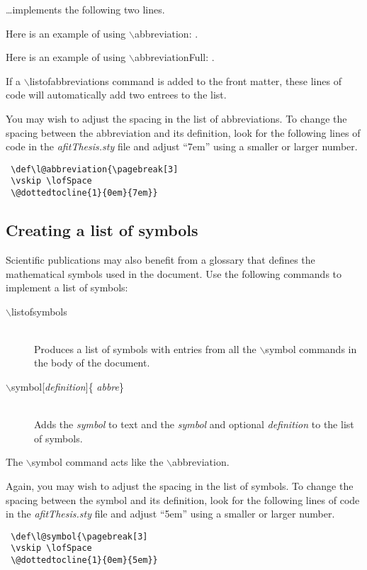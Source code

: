 \noindent \ldots implements the following two lines.

Here is an example of using $\backslash${abbreviation}: .

Here is an example of using $\backslash${abbreviationFull}:  .

\noindent If a $\backslash${listofabbreviations} command is added to the front
matter, these lines of code will automatically add two entrees to the list.

You may wish to adjust the spacing in the list of abbreviations.  To
change the spacing between the abbreviation and its definition, look
for the following lines of code in the {\em afitThesis.sty} file and
adjust ``7em'' using a smaller or larger number.

\begin{verbatim} 
 \def\l@abbreviation{\pagebreak[3]
 \vskip \lofSpace 
 \@dottedtocline{1}{0em}{7em}}
\end{verbatim}


\subsection{Creating a list of symbols}

Scientific publications may also benefit from a glossary that defines
the mathematical symbols used in the document.  Use the following
commands to implement a list of symbols:

\begin{description}
    \item[$\backslash${listofsymbols}] ~\\Produces a list of symbols
    with entries from all the $\backslash${symbol} commands in the
    body of the document.

    \item[$\backslash${symbol}[{\em definition}{]}\{{\em
    abbre}\}] ~\\Adds the {\em symbol} to text and the {\em
    symbol} and optional {\em definition} to the list of
    symbols.
\end{description}

\noindent The $\backslash${symbol} command acts like the
$\backslash${abbreviation}.

Again, you may wish to adjust the spacing in the list of symbols.  To
change the spacing between the symbol and its definition, look for the
following lines of code in the {\em afitThesis.sty} file and adjust 
``5em'' using a smaller or larger number.

\begin{verbatim}
 \def\l@symbol{\pagebreak[3]
 \vskip \lofSpace
 \@dottedtocline{1}{0em}{5em}}
\end{verbatim}